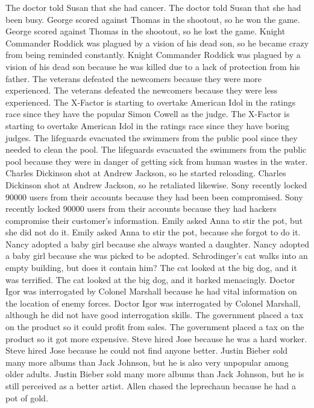 \documentclass{article}
\begin{document}
\begin{enumerate}
	The doctor told Susan that she had cancer.
	The doctor told Susan that she had been busy.
	George scored against Thomas in the shootout, so he won the game.
	George scored against Thomas in the shootout, so he lost the game.
	Knight Commander Roddick was plagued by a vision of his dead son, so he became crazy from being reminded constantly.
	Knight Commander Roddick was plagued by a vision of his dead son because he was killed due to a lack of protection from his father.
	The veterans defeated the newcomers because they were more experienced.
	The veterans defeated the newcomers because they were less experienced.
	The X-Factor is starting to overtake American Idol in the ratings race since they have the popular Simon Cowell as the judge.
	The X-Factor is starting to overtake American Idol in the ratings race since they have boring judges.
	The lifeguards evacuated the swimmers from the public pool since they needed to clean the pool.
	The lifeguards evacuated the swimmers from the public pool because they were in danger of getting sick from human wastes in the water.
	Charles Dickinson shot at Andrew Jackson, so he started reloading.
	Charles Dickinson shot at Andrew Jackson, so he retaliated likewise.
	Sony recently locked 90000 users from their accounts because they had been been compromised.
	Sony recently locked 90000 users from their accounts because they had hackers compromise their customer's information.
	Emily asked Anna to stir the pot, but she did not do it.
	Emily asked Anna to stir the pot, because she forgot to do it.
	Nancy adopted a baby girl because she always wanted a daughter.
	Nancy adopted a baby girl because she was picked to be adopted.
	Schrodinger's cat walks into an empty building, but does it contain him?
	The cat looked at the big dog, and it was terrified.
	The cat looked at the big dog, and it barked menacingly.
	Doctor Igor was interrogated by Colonel Marshall because he had vital information on the location of enemy forces.
	Doctor Igor was interrogated by Colonel Marshall, although he did not have good interrogation skills.
	The government placed a tax on the product so it could profit from sales.
	The government placed a tax on the product so it got more expensive.
	Steve hired Jose because he was a hard worker.
	Steve hired Jose because he could not find anyone better.
	Justin Bieber sold many more albums than Jack Johnson, but he is also very unpopular among older adults.
	Justin Bieber sold many more albums than Jack Johnson, but he is still perceived as a better artist.
	Allen chased the leprechaun because he had a pot of gold.

\end{enumerate}
\end{document}
